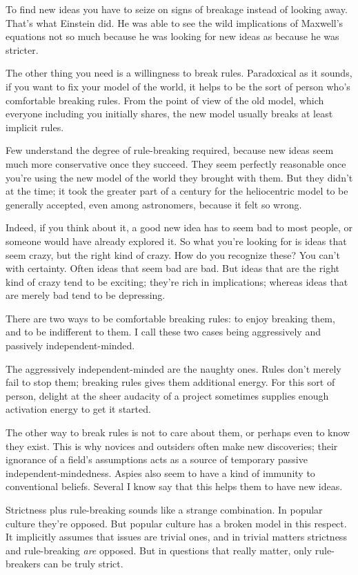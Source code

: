 \documentclass[12pt]{book}
\begin{document}
To find new ideas you have to seize on signs of breakage instead of
looking away. That's what Einstein did. He was able to see the wild
implications of Maxwell's equations not so much because he was looking
for new ideas as because he was stricter.

The other thing you need is a willingness to break rules. Paradoxical as
it sounds, if you want to fix your model of the world, it helps to be
the sort of person who's comfortable breaking rules. From the point of
view of the old model, which everyone including you initially shares,
the new model usually breaks at least implicit rules.

Few understand the degree of rule-breaking required, because new ideas
seem much more conservative once they succeed. They seem perfectly
reasonable once you're using the new model of the world they brought
with them. But they didn't at the time; it took the greater part of a
century for the heliocentric model to be generally accepted, even among
astronomers, because it felt so wrong.

Indeed, if you think about it, a good new idea has to seem bad to most
people, or someone would have already explored it. So what you're
looking for is ideas that seem crazy, but the right kind of crazy. How
do you recognize these? You can't with certainty. Often ideas that seem
bad are bad. But ideas that are the right kind of crazy tend to be
exciting; they're rich in implications; whereas ideas that are merely
bad tend to be depressing.

There are two ways to be comfortable breaking rules: to enjoy breaking
them, and to be indifferent to them. I call these two cases being
aggressively and passively independent-minded.

The aggressively independent-minded are the naughty ones. Rules don't
merely fail to stop them; breaking rules gives them additional energy.
For this sort of person, delight at the sheer audacity of a project
sometimes supplies enough activation energy to get it started.

The other way to break rules is not to care about them, or perhaps even
to know they exist. This is why novices and outsiders often make new
discoveries; their ignorance of a field's assumptions acts as a source
of temporary passive independent-mindedness. Aspies also seem to have a
kind of immunity to conventional beliefs. Several I know say that this
helps them to have new ideas.

Strictness plus rule-breaking sounds like a strange combination. In
popular culture they're opposed. But popular culture has a broken model
in this respect. It implicitly assumes that issues are trivial ones, and
in trivial matters strictness and rule-breaking \emph{are} opposed. But
in questions that really matter, only rule-breakers can be truly strict.
\end{document}
